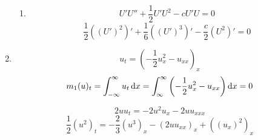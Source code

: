 \documentclass[a4paper,11pt]{scrartcl}
\newcommand*{\dx}{\dif{}x}
\begin{document}
\begin{enumerate}[label*=\textbf{8.\arabic*.}]
\begin{enumerate}
  \item
    \[U' U'' + \frac{1}{2} U' U^2 - c U' U = 0\]
    \[ \frac{1}{2}((U')^2)' + \frac{1}{6} ((U')^3)' - \frac{c}{2}(U^2)' = 0\]

\end{enumerate}

\item
  \[u_t = \left(-\frac{1}{2} u^2_x - u_{xx}\right)_x\]
  \[m_1(u)_t = \int_{-\infty}^{\infty} u_t \dx = \int_{\infty}^\infty
    \left(-\frac{1}{2} u^2_x - u_{xx}\right)\dx = 0\]

  \[ 2u u_t = - 2 u^2 u_x - 2 u u_{xxx} \]
  \[ \frac{1}{2} (u^2)_t = - \frac{2}{3} (u^3)_x - (2u u_{xx})_x + ((u_x)^2)_x \]

\end{enumerate}
\end{document}
